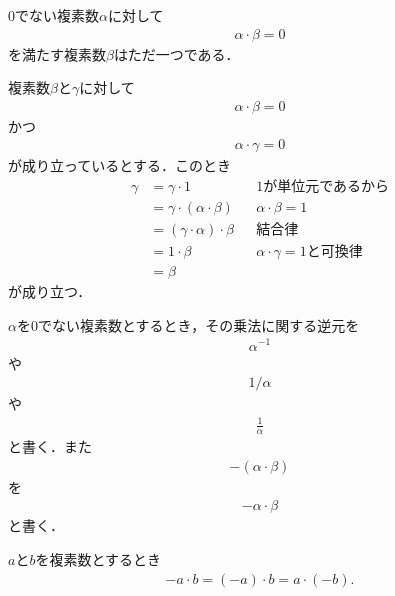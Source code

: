 	\begin{screen}
		\begin{thm}[乗法に関する逆元はただ一つ]
			$0$でない複素数$\alpha$に対して
			\begin{align}
				\alpha \cdot \beta = 0
			\end{align}
			を満たす複素数$\beta$はただ一つである．
		\end{thm}
	\end{screen}
	
	\begin{sketch}
		複素数$\beta$と$\gamma$に対して
		\begin{align}
			\alpha \cdot \beta = 0
		\end{align}
		かつ
		\begin{align}
			\alpha \cdot \gamma = 0
		\end{align}
		が成り立っているとする．このとき
		\begin{align}
			\gamma &= \gamma \cdot 1 &&\mbox{$1$が単位元であるから} \\
			&= \gamma \cdot (\alpha \cdot \beta) &&\mbox{$\alpha \cdot \beta = 1$} \\
			&= (\gamma \cdot \alpha) \cdot \beta &&\mbox{結合律} \\
			&= 1 \cdot \beta &&\mbox{$\alpha \cdot \gamma = 1$と可換律} \\
			&= \beta
		\end{align}
		が成り立つ．
		\QED
	\end{sketch}
	
	$\alpha$を$0$でない複素数とするとき，その乗法に関する逆元を
	\begin{align}
		\alpha^{-1}
	\end{align}
	や
	\begin{align}
		1/\alpha
	\end{align}
	や
	\begin{align}
		\frac{1}{\alpha}
	\end{align}
	と書く．また
	\begin{align}
		-(\alpha \cdot \beta)
	\end{align}
	を
	\begin{align}
		- \alpha \cdot \beta
	\end{align}
	と書く．
	
	\begin{screen}
		\begin{thm}[積の逆元は逆元の積]
		\label{thm:inverse_of_product}
			$a$と$b$を複素数とするとき
			\begin{align}
				-a \cdot b = (-a) \cdot b = a \cdot (-b).
			\end{align}
		\end{thm}
	\end{screen}
	
